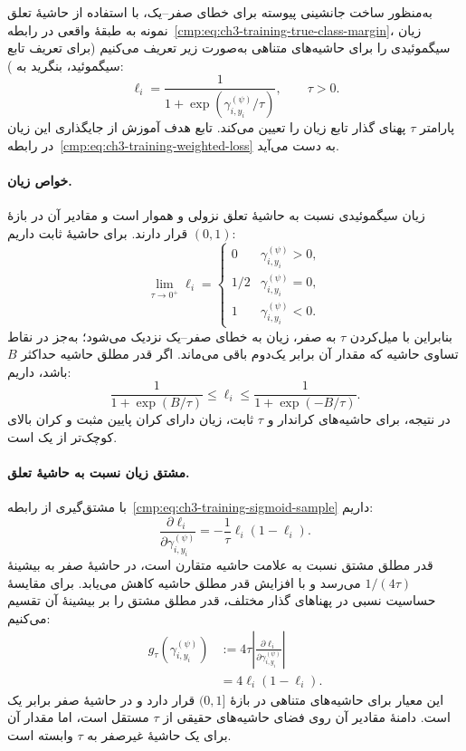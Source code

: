 به‌منظور ساخت جانشینی پیوسته برای خطای صفر--یک،
با استفاده از حاشیهٔ تعلق نمونه به طبقهٔ واقعی در
رابطه~\eqref{cmp:eq:ch3-training-true-class-margin}،
زیان سیگموئیدی را برای حاشیه‌های متناهی به‌صورت
زیر تعریف می‌کنیم (برای تعریف تابع سیگموئید، بنگرید به \cite{GoodfellowBengioCourville2016DeepLearning}):
\begin{equation}\label{cmp:eq:ch3-training-sigmoid-sample}
\boxed{
\ell_i=\frac{1}{1+\exp(\gamma_{i,y_i}^{(\psi)}/\tau)},
\qquad \tau>0.
}
\end{equation}
پارامتر $\tau$ پهنای گذار تابع زیان را تعیین می‌کند.
تابع هدف آموزش از جایگذاری این زیان در
رابطه~\eqref{cmp:eq:ch3-training-weighted-loss}
به دست می‌آید.

\paragraph{خواص زیان.}
زیان سیگموئیدی نسبت به حاشیهٔ تعلق نزولی و هموار است
و مقادیر آن در بازهٔ $(0,1)$ قرار دارند.
برای حاشیهٔ ثابت داریم:
\begin{equation}\label{cmp:eq:ch3-training-sigmoid-limit}
\lim_{\tau\to0^+}\ell_i=
\begin{cases}
0 & \gamma_{i,y_i}^{(\psi)}>0,\\
1/2 & \gamma_{i,y_i}^{(\psi)}=0,\\
1 & \gamma_{i,y_i}^{(\psi)}<0.
\end{cases}
\end{equation}
بنابراین با میل‌کردن $\tau$ به صفر، زیان به خطای
صفر--یک نزدیک می‌شود؛ به‌جز در نقاط تساوی حاشیه
که مقدار آن برابر یک‌دوم باقی می‌ماند.
اگر قدر مطلق حاشیه حداکثر $B$ باشد، داریم:
\[
\frac{1}{1+\exp(B/\tau)}
\le\ell_i\le
\frac{1}{1+\exp(-B/\tau)}.
\]
در نتیجه، برای حاشیه‌های کراندار و $\tau$ ثابت،
زیان دارای کران پایین مثبت و کران بالای کوچک‌تر
از یک است.

\paragraph{مشتق زیان نسبت به حاشیهٔ تعلق.}
با مشتق‌گیری از
رابطه~\eqref{cmp:eq:ch3-training-sigmoid-sample}
داریم:
\begin{equation}\label{cmp:eq:ch3-training-sigmoid-derivative}
\boxed{
\frac{\partial\ell_i}{\partial\gamma_{i,y_i}^{(\psi)}}
=-\frac{1}{\tau}\ell_i(1-\ell_i).
}
\end{equation}
قدر مطلق مشتق نسبت به علامت حاشیه متقارن است،
در حاشیهٔ صفر به بیشینهٔ $1/(4\tau)$ می‌رسد
و با افزایش قدر مطلق حاشیه کاهش می‌یابد.
برای مقایسهٔ حساسیت نسبی در پهناهای گذار مختلف،
قدر مطلق مشتق را بر بیشینهٔ آن تقسیم می‌کنیم:
\begin{equation}\label{cmp:eq:ch3-training-sigmoid-sensitivity}
\boxed{
\begin{aligned}
g_\tau(\gamma_{i,y_i}^{(\psi)})
&:=4\tau\left|
\frac{\partial\ell_i}{\partial\gamma_{i,y_i}^{(\psi)}}
\right|\\
&=4\ell_i(1-\ell_i).
\end{aligned}}
\end{equation}
این معیار برای حاشیه‌های متناهی در بازهٔ $(0,1]$
قرار دارد و در حاشیهٔ صفر برابر یک است.
دامنهٔ مقادیر آن روی فضای حاشیه‌های حقیقی از
$\tau$ مستقل است، اما مقدار آن برای یک حاشیهٔ
غیرصفر به $\tau$ وابسته است.

